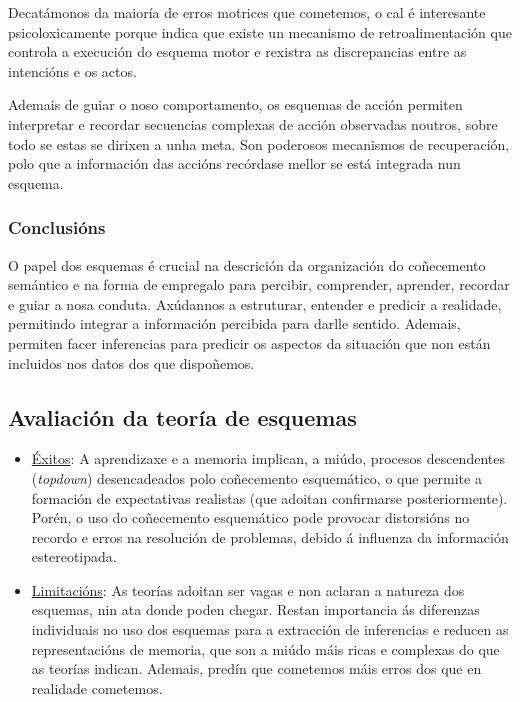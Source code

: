 \documentclass[a4paper,11pt]{article}
\begin{document}
Decatámonos da maioría de erros motrices que cometemos, o cal é interesante psicoloxicamente porque indica que existe un mecanismo de retroalimentación que controla a execución do esquema motor e rexistra as discrepancias entre as intencións e os actos.

Ademais de guiar o noso comportamento, os esquemas de acción permiten interpretar e recordar secuencias complexas de acción observadas noutros, sobre todo se estas se dirixen a unha meta. Son poderosos mecanismos de recuperación, polo que a información das accións recórdase mellor se está integrada nun esquema. 

\subsubsection{Conclusións}
O papel dos esquemas é crucial na descrición da organización do coñecemento semántico e na forma de empregalo para percibir, comprender, aprender, recordar e guiar a nosa conduta. Axúdannos a estruturar, entender e predicir a realidade, permitindo integrar a información percibida para darlle sentido. Ademais, permiten facer inferencias para predicir os aspectos da situación que non están incluidos nos datos dos que dispoñemos. 

\subsection{Avaliación da teoría de esquemas}
\begin{itemize}
	\item \underline{Éxitos}: A aprendizaxe e a memoria implican, a miúdo, procesos descendentes 
	(\textit{topdown}) desencadeados polo coñecemento esquemático, o que permite a formación de 
	expectativas realistas (que adoitan confirmarse posteriormente). Porén, o uso do coñecemento 
	esquemático pode provocar distorsións no recordo e erros na resolución de problemas, debido á 
	influenza da información estereotipada.
	\item \underline{Limitacións}: As teorías adoitan ser vagas e non aclaran a natureza dos 
	esquemas, nin ata donde poden chegar. Restan importancia ás diferenzas individuais no uso dos 
	esquemas para a extracción de inferencias e reducen as representacións de memoria, que son a 
	miúdo máis ricas e complexas do que as teorías indican. Ademais, predín que cometemos máis erros 
	dos que en realidade cometemos.
\end{itemize}
\end{document}
